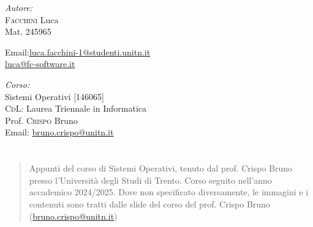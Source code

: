 \documentclass[a4paper,twoside]{report}
\makeatletter
\renewenvironment{abstract}{
    \if@twocolumn
        \section*{\abstractname}%
    \else
        \begin{center}%
            {\bfseries \abstractname\vspace{-.5em}\vspace{\z@}}%
        \end{center}%
        \small
        \begin{quotation}
    \fi}
    {\if@twocolumn\else\end{quotation}\fi}
\makeatother
\begin{document}
\begin{titlepage}
        \vfill
        \begin{minipage}[t]{0.4\textwidth}
            \begin{flushleft} \normalsize
                \emph{Autore:}\\
                \textsc{Facchini} Luca \\ %
                Mat. 245965 \\
                \vspace{-\baselineskip}
                \begin{tabbing}
                    Email:\= \href{mailto:luca.facchini-1@studenti.unitn.it}{luca.facchini-1@studenti.unitn.it} \\
                        \>  \href{mailto:luca@fc-software.it}{luca@fc-software.it}
                \end{tabbing}
            \end{flushleft}
        \end{minipage}%
        \hfill
        \begin{minipage}[t]{0.4\textwidth}
            \begin{flushleft} \normalsize
                \emph{Corso:}\\
                Sistemi Operativi [146065] \\
                \textsc{CdL}: Laurea Triennale in Informatica \\
                Prof. \textsc{Crispo} Bruno \\
                Email: \href{mailto:bruno.crispo@unitn.it}{bruno.crispo@unitn.it}
            \end{flushleft}
        \end{minipage}
        \vfill
        \begin{abstract}
            Appunti del corso di Sistemi Operativi, tenuto dal prof. Crispo Bruno presso l'Università degli Studi di Trento. Corso seguito nell'anno accademico 2024/2025.\newline
            Dove non specificato diversamente, le immagini e i contenuti sono tratti dalle slide del corso del prof. Crispo Bruno (\href{mailto:bruno.crispo@unitn.it}{bruno.crispo@unitn.it})
        \end{abstract}
        
    \end{titlepage}
    \begingroup
        \pagestyle{tocStyle}
        \tableofcontents
    \endgroup
    \thispagestyle{tocStyle}
    \pagestyle{stdPage}
    \newpage

    
    
    
    
    

    \newpage

    
\end{document}
